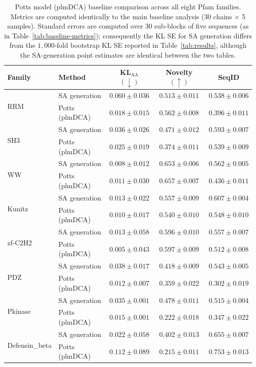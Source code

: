 \begin{table}[ht]
\centering
\caption{Potts model (plmDCA) baseline comparison across all eight Pfam families. Metrics are computed identically to the main baseline analysis (30 chains $\times$ 5 samples). Standard errors are computed over $30$ sub-blocks of five sequences (as in Table~\ref{tab:baseline-metrics}); consequently the KL SE for SA generation differs from the $1{,}000$-fold bootstrap KL SE reported in Table~\ref{tab:results}, although the SA-generation point estimates are identical between the two tables.}
\label{tab:potts}
\small
\begin{tabular}{@{}llccc@{}}
\toprule
Family & Method & KL$_{\mathrm{AA}}$ $(\downarrow)$ & Novelty $(\uparrow)$ & SeqID \\
\midrule
\multirow{2}{*}{RRM}
 & SA generation    & $0.060 \pm 0.036$ & $0.513 \pm 0.011$ & $0.538 \pm 0.006$ \\
 & Potts (plmDCA)   & $0.018 \pm 0.015$ & $0.562 \pm 0.008$ & $0.396 \pm 0.011$ \\
\midrule
\multirow{2}{*}{SH3}
 & SA generation    & $0.036 \pm 0.026$ & $0.471 \pm 0.012$ & $0.593 \pm 0.007$ \\
 & Potts (plmDCA)   & $0.025 \pm 0.019$ & $0.374 \pm 0.011$ & $0.539 \pm 0.009$ \\
\midrule
\multirow{2}{*}{WW}
 & SA generation    & $0.008 \pm 0.012$ & $0.653 \pm 0.006$ & $0.562 \pm 0.005$ \\
 & Potts (plmDCA)   & $0.011 \pm 0.030$ & $0.657 \pm 0.007$ & $0.436 \pm 0.011$ \\
\midrule
\multirow{2}{*}{Kunitz}
 & SA generation    & $0.013 \pm 0.022$ & $0.557 \pm 0.009$ & $0.607 \pm 0.004$ \\
 & Potts (plmDCA)   & $0.010 \pm 0.017$ & $0.540 \pm 0.010$ & $0.548 \pm 0.010$ \\
\midrule
\multirow{2}{*}{zf-C2H2}
 & SA generation    & $0.013 \pm 0.058$ & $0.596 \pm 0.010$ & $0.557 \pm 0.007$ \\
 & Potts (plmDCA)   & $0.005 \pm 0.043$ & $0.597 \pm 0.009$ & $0.512 \pm 0.008$ \\
\midrule
\multirow{2}{*}{PDZ}
 & SA generation    & $0.038 \pm 0.017$ & $0.418 \pm 0.009$ & $0.543 \pm 0.005$ \\
 & Potts (plmDCA)   & $0.012 \pm 0.007$ & $0.359 \pm 0.022$ & $0.302 \pm 0.019$ \\
\midrule
\multirow{2}{*}{Pkinase}
 & SA generation    & $0.035 \pm 0.001$ & $0.478 \pm 0.011$ & $0.515 \pm 0.004$ \\
 & Potts (plmDCA)   & $0.015 \pm 0.001$ & $0.222 \pm 0.018$ & $0.347 \pm 0.022$ \\
\midrule
\multirow{2}{*}{Defensin\_beta}
 & SA generation    & $0.022 \pm 0.058$ & $0.402 \pm 0.013$ & $0.655 \pm 0.007$ \\
 & Potts (plmDCA)   & $0.112 \pm 0.089$ & $0.215 \pm 0.011$ & $0.753 \pm 0.013$ \\
\bottomrule
\end{tabular}
\end{table}

